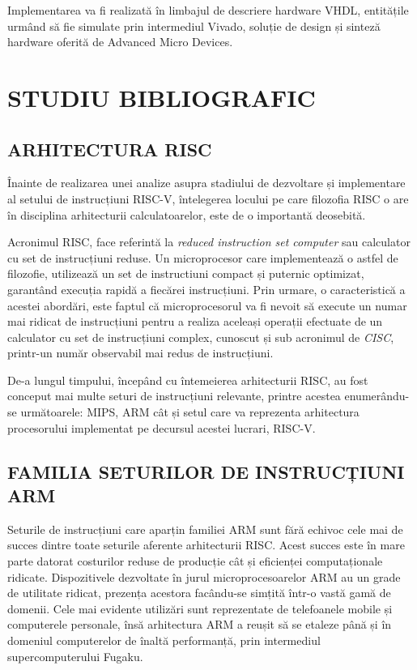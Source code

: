 \documentclass[12pt]{article}
\begin{document}
Implementarea va fi realizată în limbajul de descriere hardware VHDL, entitățile urmând să fie simulate prin intermediul Vivado, soluție de design și sinteză hardware oferită de Advanced Micro Devices.


\newpage
\section{\centering STUDIU BIBLIOGRAFIC}
\bigbreak
\subsection{ARHITECTURA RISC}
Înainte de realizarea unei analize asupra stadiului de dezvoltare și implementare al setului de instrucțiuni RISC-V, întelegerea locului pe care filozofia RISC o are în disciplina arhitecturii calculatoarelor, este de o importantă deosebită.

Acronimul RISC, face referintă la \textit{reduced instruction set computer} sau calculator cu set de instrucțiuni reduse. Un microprocesor care implementează o astfel de filozofie, utilizează un set de instructiuni compact și puternic optimizat, garantând execuția rapidă a fiecărei instrucțiuni. Prin urmare, o caracteristică a acestei abordări, este faptul că microprocesorul va fi nevoit să execute un numar mai ridicat de instrucțiuni pentru a realiza aceleași operații efectuate de un calculator cu set de instrucțiuni complex, cunoscut și sub acronimul de \textit{CISC}, printr-un număr observabil mai redus de instrucțiuni.

De-a lungul timpului, începând cu întemeierea arhitecturii RISC, au fost conceput mai multe seturi de instrucțiuni relevante, printre acestea enumerându-se următoarele: MIPS, ARM cât și setul care va reprezenta arhitectura procesorului implementat pe decursul acestei lucrari, RISC-V.

\subsection{FAMILIA SETURILOR DE INSTRUCȚIUNI ARM}
Seturile de instrucțiuni care aparțin familiei ARM sunt fără echivoc cele mai de succes dintre toate seturile aferente arhitecturii RISC. Acest succes este în mare parte datorat costurilor reduse de producție cât și eficienței computaționale ridicate. Dispozitivele dezvoltate în jurul microprocesoarelor ARM au un grade de utilitate ridicat, prezența acestora facându-se simțită într-o vastă gamă de domenii. Cele mai evidente utilizări sunt reprezentate de telefoanele mobile și computerele personale, însă arhitectura ARM a reușit să se etaleze până și în domeniul computerelor de înaltă performanță, prin intermediul supercomputerului Fugaku.
\end{document}
